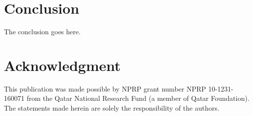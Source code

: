 \documentclass[journal,comsoc]{IEEEtran}
\renewcommand{\^}{\hat}  %
\begin{document}




\section{Conclusion}
The conclusion goes here.






%
\section*{Acknowledgment}
%
This publication was made possible by NPRP grant number NPRP 10-1231-160071 from the Qatar National Research Fund (a member of Qatar Foundation). The statements made herein are solely the responsibility of the authors.
\end{document}
